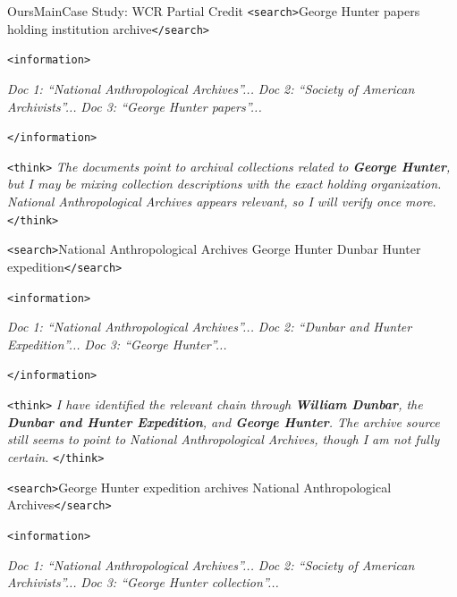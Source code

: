 \begin{casebox}{OursMain}{Case Study: WCR Partial Credit}
\textcolor{TagSearch}{\texttt{<search>}}George Hunter papers holding institution archive\textcolor{TagSearch}{\texttt{</search>}}

\textcolor{TagInfo}{\texttt{<information>}}

\textit{Doc 1: ``National Anthropological Archives''...} \textit{Doc 2: ``Society of American Archivists''...} \textit{Doc 3: ``George Hunter papers''...}

\textcolor{TagInfo}{\texttt{</information>}}
\vspace{3mm}

\begin{thinkpanel}
\textcolor{TagThink}{\texttt{<think>}} \textit{The documents point to archival collections related to \colorbox{yellow!30}{\textbf{George Hunter}}, but I may be mixing collection descriptions with the exact holding organization. National Anthropological Archives appears relevant, so I will verify once more.} \textcolor{TagThink}{\texttt{</think>}}
\end{thinkpanel}

\textcolor{TagSearch}{\texttt{<search>}}National Anthropological Archives George Hunter Dunbar Hunter expedition\textcolor{TagSearch}{\texttt{</search>}}

\textcolor{TagInfo}{\texttt{<information>}}

\textit{Doc 1: ``National Anthropological Archives''...} \textit{Doc 2: ``Dunbar and Hunter Expedition''...} \textit{Doc 3: ``George Hunter''...}

\textcolor{TagInfo}{\texttt{</information>}}
\vspace{3mm}

\begin{thinkpanel}
\textcolor{TagThink}{\texttt{<think>}} \textit{I have identified the relevant chain through \colorbox{yellow!30}{\textbf{William Dunbar}}, the \colorbox{yellow!30}{\textbf{Dunbar and Hunter Expedition}}, and \colorbox{yellow!30}{\textbf{George Hunter}}. The archive source still seems to point to National Anthropological Archives, though I am not fully certain.} \textcolor{TagThink}{\texttt{</think>}}
\end{thinkpanel}

\textcolor{TagSearch}{\texttt{<search>}}George Hunter expedition archives National Anthropological Archives\textcolor{TagSearch}{\texttt{</search>}}

\textcolor{TagInfo}{\texttt{<information>}}

\textit{Doc 1: ``National Anthropological Archives''...} \textit{Doc 2: ``Society of American Archivists''...} \textit{Doc 3: ``George Hunter collection''...}


\end{casebox}
